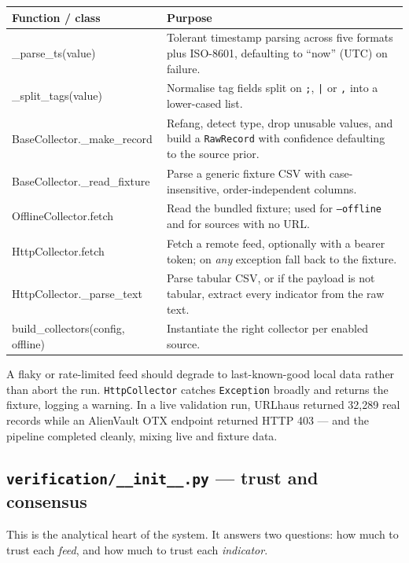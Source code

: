 \documentclass[11pt,a4paper]{article}
\newcommand{\code}[1]{\texttt{\small #1}}
\begin{document}
\begin{center}
\begin{tabularx}{\linewidth}{@{}>{\ttfamily\small}p{4.4cm}X@{}}
\toprule
\rowcolor{paper}\textbf{Function / class} & \textbf{Purpose} \\
\midrule
\_parse\_ts(value) & Tolerant timestamp parsing across five formats plus ISO-8601, defaulting to ``now'' (UTC) on failure. \\
\_split\_tags(value) & Normalise tag fields split on \code{;}, \code{|} or \code{,} into a lower-cased list. \\
BaseCollector.\_make\_record & Refang, detect type, drop unusable values, and build a \code{RawRecord} with confidence defaulting to the source prior. \\
BaseCollector.\_read\_fixture & Parse a generic fixture CSV with case-insensitive, order-independent columns. \\
OfflineCollector.fetch & Read the bundled fixture; used for \code{--offline} and for sources with no URL. \\
HttpCollector.fetch & Fetch a remote feed, optionally with a bearer token; on \emph{any} exception fall back to the fixture. \\
HttpCollector.\_parse\_text & Parse tabular CSV, or if the payload is not tabular, extract every indicator from the raw text. \\
build\_collectors(config, offline) & Instantiate the right collector per enabled source. \\
\bottomrule
\end{tabularx}
\end{center}

\begin{notebox}
A flaky or rate-limited feed should degrade to last-known-good local data rather
than abort the run. \code{HttpCollector} catches \code{Exception} broadly and
returns the fixture, logging a warning. In a live validation run, URLhaus
returned 32{,}289 real records while an AlienVault OTX endpoint returned HTTP 403
--- and the pipeline completed cleanly, mixing live and fixture data.
\end{notebox}

\subsection{\code{verification/\_\_init\_\_.py} --- trust and consensus}
This is the analytical heart of the system. It answers two questions: how much
to trust each \emph{feed}, and how much to trust each \emph{indicator}.
\end{document}
